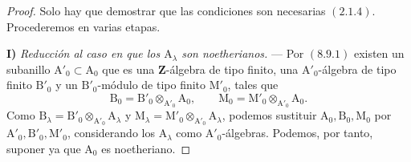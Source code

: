 \begin{proof}
Solo hay que demostrar que las condiciones son necesarias $(2.1.4)$. Procederemos en varias etapas.

\medskip
\noindent\textbf{I)} \emph{Reducción al caso en que los
$\mathrm{A}_\lambda$ son noetherianos.} --- Por $(8.9.1)$ existen un
subanillo $\mathrm{A}'_0\subset\mathrm{A}_0$ que es una
$\mathbf{Z}$-álgebra de tipo finito, una $\mathrm{A}'_0$-álgebra de tipo finito
$\mathrm{B}'_0$ y un $\mathrm{B}'_0$-módulo de tipo finito
$\mathrm{M}'_0$, tales que
\[
  \mathrm{B}_0=\mathrm{B}'_0\otimes_{\mathrm{A}'_0}\mathrm{A}_0,
  \qquad
  \mathrm{M}_0=\mathrm{M}'_0\otimes_{\mathrm{A}'_0}\mathrm{A}_0.
\]
Como
$\mathrm{B}_\lambda=\mathrm{B}'_0\otimes_{\mathrm{A}'_0}
\mathrm{A}_\lambda$ y
$\mathrm{M}_\lambda=\mathrm{M}'_0\otimes_{\mathrm{A}'_0}
\mathrm{A}_\lambda$, podemos sustituir
$\mathrm{A}_0,\mathrm{B}_0,\mathrm{M}_0$ por
$\mathrm{A}'_0,\mathrm{B}'_0,\mathrm{M}'_0$, considerando los
$\mathrm{A}_\lambda$ como $\mathrm{A}'_0$-álgebras. Podemos, por tanto,
suponer ya que $\mathrm{A}_0$ es noetheriano.


\end{proof}
